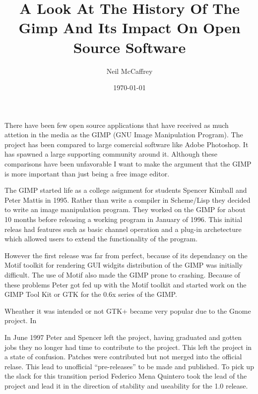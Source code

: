 \documentclass[a4 paper, 12pt]{article}
\begin{document}
\author{Neil McCaffrey}
\title{A Look At The History Of The Gimp And Its Impact On Open Source
Software}
\date{\today}
\maketitle


	There have been few open source applications that have received as much
	attetion in the media as the GIMP (GNU Image Manipulation Program). The
	project has been compared to large comercial software like Adobe Photoshop.
	It has spawned a large supporting community around it. Although these
	comparisons have been unfavorable I want to make the argument that the GIMP
	is more important than just being a free image editor.

	The GIMP started life as a college asignment for students Spencer Kimball
	and Peter Mattis in 1995. Rather than write a compiler in Scheme/Lisp they
	decided to write an image manipulation program. They worked on the GIMP for
	about 10 months before releasing a working program in January of 1996. This
	initial releas had features such as basic channel operation and a plug-in
	archetecture which allowed users to extend the functionality of the
	program.

	However the first release was far from perfect, because of its dependancy
	on the Motif toolkit for rendering GUI widgits distribution of the GIMP was
	initially difficult. The use of Motif also made the GIMP prone to crashing.
	Because of these problems Peter got fed up with the Motif toolkit and
	started work on the GIMP Tool Kit or GTK for the 0.6x series of the GIMP.

	Wheather it was intended or not GTK+ became very popular due to the Gnome
	project. In 

	In June 1997 Peter and Spencer left the project, having graduated and gotten
	jobs they no longer had time to contribute to the project. This left the
	project in a state of confusion. Patches were contributed but not merged
	into the official relase. This lead to unofficial ``pre-releases'' to be
	made and published. To pick up the slack for this transition period Federico
	Mena Quintero took the lead of the project and lead it in the direction of
	stability and useability for the 1.0 release.
\end{document}
